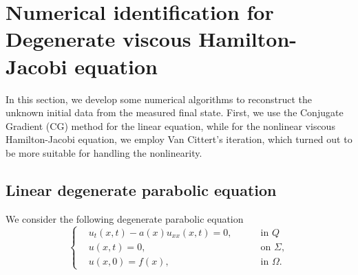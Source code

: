 \documentclass[reqno]{amsart}
\theoremstyle{plain}
\theoremstyle{remark}
\numberwithin{equation}{section}
\begin{document}
\section{Numerical identification for Degenerate viscous Hamilton-Jacobi equation}\label{sec5}
In this section, we develop some numerical algorithms to reconstruct the unknown initial data from the measured final state.
First, we use the Conjugate Gradient (CG) method for the linear equation, while for the nonlinear viscous Hamilton-Jacobi equation, we employ Van Cittert's iteration, which turned out to be more suitable for handling the nonlinearity.

\subsection{Linear degenerate parabolic equation}\label{s1}
We consider the following degenerate parabolic equation 
\begin{equation}
    \left\{
\begin{aligned}\label{1}
& u_{t}(x,t) -a(x) u_{xx}(x,t)=0, &&\quad \text { in } Q\\
& u(x,t)=0, &&\quad \text{ on } \Sigma,\\
&u(x,0)=f(x), &&\quad \text { in } \Omega.
\end{aligned}
\right.
\end{equation}
\end{document}
